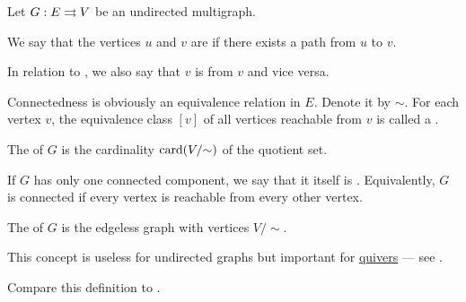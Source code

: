 \begin{definition}\label{def:undirected_multigraph_connectedness}
  Let \( G: E \rightrightarrows V \) be an undirected multigraph.

  \begin{thmenum}
     We say that the vertices \( u \) and \( v \) are  if there exists a path from \( u \) to \( v \).

    In relation to , we also say that \( v \) is  from \( v \) and vice versa.

     Connectedness is obviously an equivalence relation in \( E \). Denote it by \( {\sim} \). For each vertex \( v \), the equivalence class \( [v] \) of all vertices reachable from \( v \) is called a .

    The  of \( G \) is the cardinality \( \operatorname{card}(V / {\sim}) \) of the quotient set.

    If \( G \) has only one connected component, we say that it itself is . Equivalently, \( G \) is connected if every vertex is reachable from every other vertex.

     The  of \( G \) is the edgeless graph with vertices \( V / {\sim} \).

    This concept is useless for undirected graphs but important for \hyperref[def:quiver]{quivers} --- see .
  \end{thmenum}

  Compare this definition to .
\end{definition}
